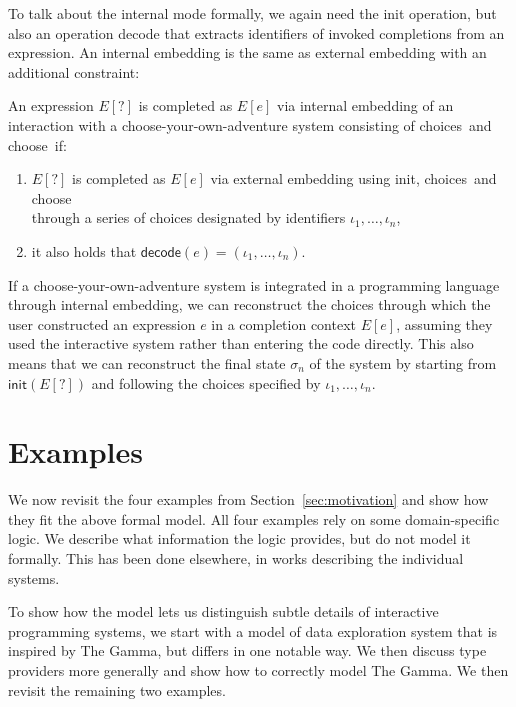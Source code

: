 \documentclass[a4paper,UKenglish,cleveref, autoref, thm-restate]{lipics-v2021}
\newcommand{\ident}[1]{\textsf{#1}}
\newcommand{\select}{\textnormal{\ident{choose}}}
\newcommand{\choices}{\textnormal{\ident{choices}}}
\begin{document}
To talk about the internal mode formally, we again need the \ident{init} operation, but also an
operation \ident{decode} that extracts identifiers of invoked completions from an expression.
An internal embedding is the same as external embedding with an additional constraint:

\begin{definition}\label{def:internal}
An expression $E[?]$ is completed as $E[e]$ via internal embedding of an interaction with
a choose-your-own-adventure system consisting of \choices\ and \select\ if:

\vspace{-0.25em}
\raggedright
\begin{enumerate}
\item $E[?]$ is completed as $E[e]$ via external embedding using \ident{init}, \choices\ and \select\\
  through a series of choices designated by identifiers $\iota_1, \ldots, \iota_n$,
\item it also holds that $\ident{decode}(e)=(\iota_1, \ldots, \iota_n)$.
\end{enumerate}
\end{definition}

If a choose-your-own-adventure system is integrated in a programming language
through internal embedding, we can reconstruct the choices through which the user constructed
an expression $e$ in a completion context $E[e]$, assuming they used the interactive system rather
than entering the code directly. This also means that we can reconstruct the final state $\sigma_n$
of the system by starting from $\ident{init}(E[?])$ and following the choices specified by
$\iota_1, \ldots, \iota_n$.


\newpage
\section{Examples}
\label{sec:examples}

We now revisit the four examples from Section~\ref{sec:motivation} and show how they fit the
above formal model. All four examples rely on some domain-specific logic. We describe what
information the logic provides, but do not model it formally. This has been done elsewhere,
in works describing the individual systems.

To show how the model lets us distinguish subtle details of interactive programming systems,
we start with a model of data exploration system that is inspired by The Gamma, but differs in
one notable way. We then discuss type providers more generally and show how to correctly model
The Gamma. We then revisit the remaining two examples.
\end{document}
